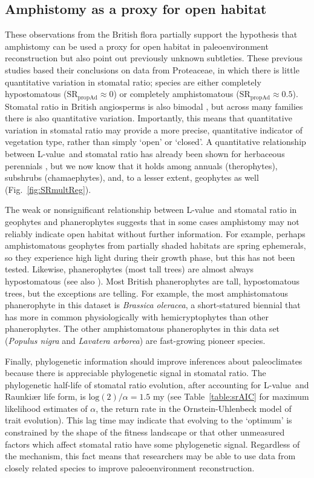 \documentclass[12pt, oneside]{article}
\newcommand{\el}{L-value}
\begin{document}
\subsection*{Amphistomy as a proxy for open habitat}

These observations from the British flora partially support the hypothesis that amphistomy can be used a proxy for open habitat in paleoenvironment reconstruction \citep{Carpenter_1994, Jordan_etal_2014, Carpenter_etal_2015} but also point out previously unknown subtleties. These previous studies based their conclusions on data from Proteaceae, in which there is little quantitative variation in stomatal ratio; species are either completely hypostomatous ($\mathrm{SR_{propAd}} \approx 0$) or completely amphistomatous ($\mathrm{SR_{propAd}} \approx 0.5$). Stomatal ratio in British angiosperms is also bimodal \citep{Peat_Fitter_1994b}, but across many families there is also quantitative variation. Importantly, this means that quantitative variation in stomatal ratio may provide a more precise, quantitative indicator of vegetation type, rather than simply `open' or `closed'. A quantitative relationship between \el~and stomatal ratio has already been shown for herbaceous perennials \citep{Bucher_etal_2017}, but we now know that it holds among annuals (therophytes), subshrubs (chamaephytes), and, to a lesser extent, geophytes as well (Fig.~\ref{fig:SRmultReg}). 

The weak or nonsignificant relationship between \el~and stomatal ratio in geophytes and phanerophytes suggests that in some cases amphistomy may not reliably indicate open habitat without further information. For example, perhaps amphistomatous geophytes from partially shaded habitats are spring ephemerals, so they  experience high light during their growth phase, but this has not been tested. Likewise, phanerophytes (most tall trees) are almost always hypostomatous (see also \cite{Muir_2015}). Most British phanerophytes are tall, hypostomatous trees, but the exceptions are telling. For example, the most amphistomatous phanerophyte in this dataset is \textit{Brassica oleracea}, a short-statured biennial that has more in common physiologically with hemicryptophytes than other phanerophytes. The other amphistomatous phanerophytes in this data set (\textit{Populus nigra} and \textit{Lavatera arborea}) are fast-growing pioneer species.

Finally, phylogenetic information should improve inferences about paleoclimates because there is appreciable phylogenetic signal in stomatal ratio. The phylogenetic half-life of stomatal ratio evolution, after accounting for \el~and Raunki\ae r life form, is $\mathrm{log}(2) / \alpha = 1.5$ my (see Table~\ref{table:srAIC} for maximum likelihood estimates of $\alpha$, the return rate in the Ornstein-Uhlenbeck model of trait evolution). This lag time may indicate that evolving to the `optimum' is constrained by the shape of the fitness landscape \citep{Muir_2015} or that other unmeasured factors which affect stomatal ratio have some phylogenetic signal. Regardless of the mechanism, this fact means that researchers may be able to use data from closely related species to improve paleoenvironment reconstruction.
\end{document}
